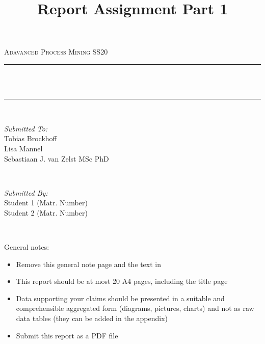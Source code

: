\documentclass[12pt]{report}
\title{Report Assignment Part 1}
\author{}
\date{}
\makeatletter
\let\thetitle\@title
\makeatother
\begin{document}

\begin{titlepage}
	\centering
    \vspace*{0.5 cm}
  \begin{center}    \textsc{\Large   Adavanced Process Mining SS20}\\[2.0 cm]	\end{center}
	\rule{\linewidth}{0.2 mm} \\[0.4 cm]
	{ \huge \bfseries \thetitle}\\
	\rule{\linewidth}{0.2 mm} \\[1.5 cm]
	
  \begin{minipage}{0.48\textwidth}
    \begin{flushleft} \large
      \emph{Submitted To:}\\
      Tobias Brockhoff\\
      Lisa Mannel\\
      Sebastiaan J. van Zelst MSc PhD\\
    \end{flushleft}
  \end{minipage}~
  \begin{minipage}{0.48\textwidth}
    \begin{flushright} \large
			\emph{Submitted By:} \\
      Student 1 (Matr. Number) \\
      Student 2 (Matr. Number) 
		\end{flushright}
	\end{minipage}\\[2 cm]
	
\end{titlepage}


\renewcommand{\thesection}{\arabic{section}}
General notes:
\begin{itemize}
  \item Remove this general note page and the text in \textlangle \textrangle
  \item This report should be at most 20 A4 pages, including the title page 
  \item	Data supporting your claims should be presented in a suitable and comprehensible aggregated form (diagrams, pictures, charts) and not as raw data tables (they can be added in the appendix)
  \item Submit this report as a PDF file
\end{itemize}
\newpage
\end{document}
